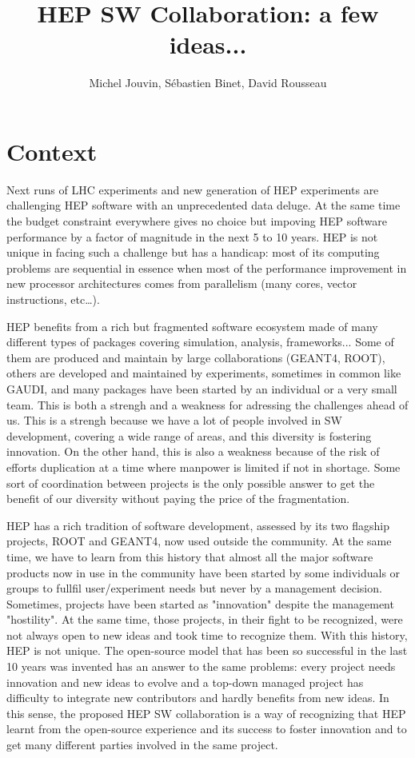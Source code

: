\documentclass[11pt]{article} %
\title{HEP SW Collaboration: a few ideas...}
\author{Michel Jouvin, S\'ebastien Binet, David Rousseau}
\begin{document}
\maketitle

\section{Context}

Next runs of LHC experiments and new generation of HEP experiments are
challenging HEP software with an unprecedented data deluge. At the
same time the budget constraint everywhere gives no choice but
impoving HEP software performance by a factor of magnitude in the next
5 to 10 years. HEP is not unique in facing such a challenge but has a
handicap: most of its computing problems are sequential in essence
when most of the performance improvement in new processor
architectures comes from parallelism (many cores, vector
instructions, etc\ldots).

HEP benefits from a rich but fragmented software ecosystem made of
many different types of packages covering simulation, analysis,
frameworks... Some of them are produced and maintain by large
collaborations (GEANT4, ROOT), others are developed and maintained by
experiments, sometimes in common like GAUDI, and many packages have
been started by an individual or a very small team. This is both a
strengh and a weakness for adressing the challenges ahead of us. This
is a strengh because we have a lot of people involved in SW
development, covering a wide range of areas, and this diversity is
fostering innovation. On the other hand, this is also a weakness
because of the risk of efforts duplication at a time where manpower is
limited if not in shortage. Some sort of coordination between projects
is the only possible answer to get the benefit of our diversity
without paying the price of the fragmentation.

HEP has a rich tradition of software development, assessed by its two
flagship projects, ROOT and GEANT4, now used outside the community. At
the same time, we have to learn from this history that almost all the
major software products now in use in the community have been started
by some individuals or groups to fullfil user/experiment needs but
never by a management decision. Sometimes, projects have been started
as "innovation" despite the management "hostility". At the same time,
those projects, in their fight to be recognized, were not always open
to new ideas and took time to recognize them. With this history, HEP
is not unique. The open-source model that has been so successful in
the last 10 years was invented has an answer to the same problems:
every project needs innovation and new ideas to evolve and a top-down
managed project has difficulty to integrate new contributors and
hardly benefits from new ideas. In this sense, the proposed HEP SW
collaboration is a way of recognizing that HEP learnt from the
open-source experience and its success to foster innovation and to get
many different parties involved in the same project.
\end{document}
